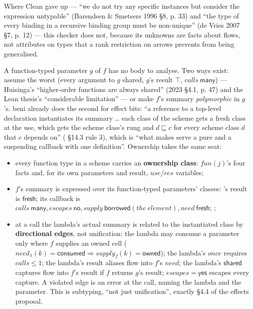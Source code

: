 Where Clean gave up — “we do not try any specific instances but consider the expression untypable” (Barendsen \& Smetsers 1996 §8, p. 33) and “the type of every binding in a recursive binding group must be non-unique” (de Vries 2007 §7, p. 12) — this checker does not, because its unknowns are facts about flows, not attributes on types that a rank restriction on arrows prevents from being generalised.


A function-typed parameter $g$ of $f$ has no body to analyse. Two ways exist: assume the worst (every argument to $g$ shared, $g$'s result $\top$, $\mathit{calls}\ \mathsf{many}$) — Huisinga's “higher-order functions are always shared” (2023 §4.1, p. 47) and the Lean thesis's “considerable limitation” — or make $f$'s summary \emph{polymorphic} in $g$'s. beni already does the second for effect bits: “a reference to a top-level declaration instantiates its summary … each class of the scheme gets a fresh class at the use, which gets the scheme class's rung and $d\sqsubseteq c$ for every scheme class $d$ that $c$ depends on” ( §14.3 rule 3), which is “what makes  serve a pure and a suspending callback with one definition”. Ownership takes the same seat:

\begin{itemize}
\item every function type in a scheme carries an \textbf{ownership class}: $\mathit{fun}(j)$'s four facts and, for its own parameters and result, $\mathit{use}$/$\mathit{res}$ variables;
\item $f$'s summary is expressed over its function-typed parameters' classes: 's result is $\mathsf{fresh}$; its callback is $\mathit{calls}\ \mathsf{many},\allowbreak{}\mathit{escapes}\ \mathsf{no},\allowbreak{}\mathit{supply}\ \mathsf{borrowed}(\mathit{the}\ \mathit{element}),\allowbreak{}\mathit{need}\ \mathsf{fresh}$; ;
\item at a call  the lambda's actual summary is related to the instantiated class by \textbf{directional edges}, not unification: the lambda may consume a parameter only where $f$ supplies an owned cell ($\mathit{need}_{\lambda}(k)=\mathsf{consumed}\Longrightarrow \mathit{supply}_{f}(k)=\mathsf{owned}$); the lambda's $\mathit{once}$ requires $\mathit{calls}\le 1$; the lambda's result aliases flow into $f$'s $\mathit{need}$; the lambda's $\mathsf{shared}$ captures flow into $f$'s result if $f$ returns $g$'s result; $\mathit{escapes}=\mathsf{yes}$ escapes every capture. A violated edge is an error at the call, naming the lambda and the parameter. This is subtyping, “not just unification”, exactly §4.4 of the effects proposal.
\end{itemize}


